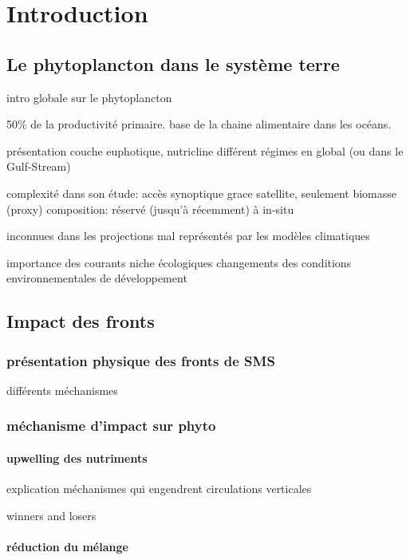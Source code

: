 
\chapter{Introduction}

\nocite{*}

\section{Le phytoplancton dans le système terre}

intro globale sur le phytoplancton

50\% de la productivité primaire.
base de la chaine alimentaire dans les océans.

présentation couche euphotique, nutricline
différent régimes en global (ou dans le Gulf-Stream)

complexité dans son étude:
accès synoptique grace satellite, seulement biomasse (proxy)
composition: réservé (jusqu'à récemment) à in-situ

inconnues dans les projections
mal représentés par les modèles climatiques

importance des courants
niche écologiques
changements des conditions environnementales de développement

\section{Impact des fronts}

\subsection{présentation physique des fronts de SMS}

différents méchanismes

\subsection{méchanisme d'impact sur phyto}

\subsubsection{upwelling des nutriments}

explication méchanismes qui engendrent circulations verticales

winners and losers

\subsubsection{réduction du mélange}

